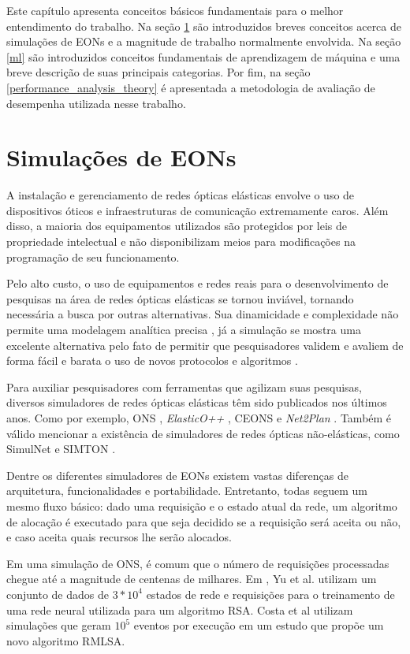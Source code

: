 Este capítulo apresenta conceitos básicos fundamentais para o melhor entendimento do trabalho. Na seção \ref{ft_eon} são introduzidos breves conceitos acerca de simulações de EONs e a magnitude de trabalho normalmente envolvida. Na seção \ref{ml} são introduzidos conceitos fundamentais de aprendizagem de máquina e uma breve descrição de suas principais categorias. Por fim, na seção \ref{performance_analysis_theory} é apresentada a metodologia de avaliação de desempenha utilizada nesse trabalho.

\section{Simulações de EONs}%
\label{ft_eon}

A instalação e gerenciamento de redes ópticas elásticas envolve o uso de dispositivos óticos e infraestruturas de comunicação extremamente caros. Além disso, a maioria dos equipamentos utilizados são protegidos por leis de propriedade intelectual e não disponibilizam meios para modificações na programação de seu funcionamento.

Pelo alto custo, o uso de equipamentos e redes reais para o desenvolvimento de pesquisas na área de redes ópticas elásticas se tornou inviável, tornando necessária a busca por outras alternativas. Sua dinamicidade e complexidade não permite uma modelagem analítica precisa \cite{costa2016ons}, já a simulação se mostra uma excelente alternativa pelo fato de permitir que pesquisadores validem e avaliem de forma fácil e barata o uso de novos protocolos e algoritmos \cite{simulnet2009}.

Para auxiliar pesquisadores com ferramentas que agilizam suas pesquisas, diversos simuladores de redes ópticas elásticas têm sido publicados nos últimos anos. Como por exemplo, \acrfull{ONS} \cite{costa2016ons}, \textit{ElasticO++} \cite{TESSINARI201695}, \acrfull{CEONS} \cite{ceons2015} e \textit{Net2Plan} \cite{net2plan}. Também é válido mencionar a existência de simuladores de redes ópticas não-elásticas, como SimulNet \cite{simulnet2009} e SIMTON \cite{chaves2010}.

Dentre os diferentes simuladores de EONs existem vastas diferenças de arquitetura, funcionalidades e portabilidade. Entretanto, todas seguem um mesmo fluxo básico: dado uma requisição e o estado atual da rede, um algoritmo de alocação é executado para que seja decidido se a requisição será aceita ou não, e caso aceita quais recursos lhe serão alocados.

Em uma simulação de ONS, é comum que o número de requisições processadas chegue até a magnitude de centenas de milhares. Em \cite{eon_ml_rsa_dl_2019}, Yu et al. utilizam um conjunto de dados de $3 * 10^4$ estados de rede e requisições para o treinamento de uma rede neural utilizada para um algoritmo RSA. Costa et al  \cite{rmlsaacosta2020} utilizam simulações que geram $10^5$ eventos por execução em um estudo que propõe um novo algoritmo RMLSA.

